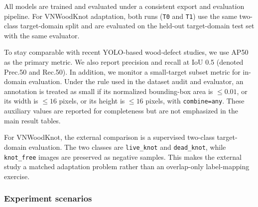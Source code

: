 \documentclass[cmc,article,submit,moreauthors,pdftex]{Definitions/tsp}
\begin{document}
All models are trained and evaluated under a consistent export and evaluation pipeline. For VNWoodKnot adaptation, both runs (\texttt{T0} and \texttt{T1}) use the same two-class target-domain split and are evaluated on the held-out target-domain test set with the same evaluator.

To stay comparable with recent YOLO-based wood-defect studies, we use AP50 as the primary metric. We also report precision and recall at IoU 0.5 (denoted Prec.50 and Rec.50). %
In addition, we monitor a small-target subset metric for in-domain evaluation. Under the rule used in the dataset audit and evaluator, an annotation is treated as small if its normalized bounding-box area is $\leq 0.01$, or its width is $\leq 16$ pixels, or its height is $\leq 16$ pixels, with \texttt{combine=any}. These auxiliary values are reported for completeness but are not emphasized in the main result tables.

For VNWoodKnot, the external comparison is a supervised two-class target-domain evaluation. The two classes are \texttt{live\_knot} and \texttt{dead\_knot}, while \texttt{knot\_free} images are preserved as negative samples. This makes the external study a matched adaptation problem rather than an overlap-only label-mapping exercise.

\subsubsection{Experiment scenarios}
\end{document}
